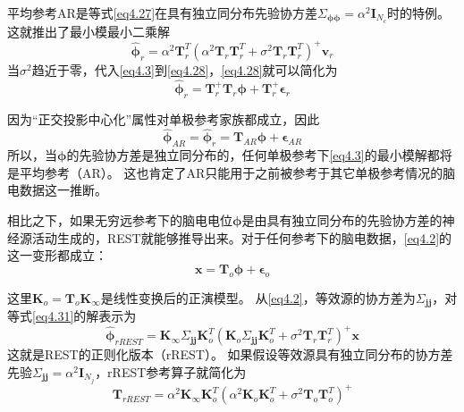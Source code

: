 平均参考AR是等式\eqref{eq4.27}在具有独立同分布先验协方差$\Sigma_{\mathbf{\phi\phi}}=\alpha^2\mathbf{I}_{N_c}$时的特例。 这就推出了最小模最小二乘解
\begin{equation}\label{eq4.28}
\hat{\mathbf{\phi}}_r=\alpha^2\mathbf{T}_r^T(\alpha^2\mathbf{T}_r\mathbf{T}_r^T+\sigma^2\mathbf{T}_r\mathbf{T}_r^T)^+\mathbf{v}_r
\end{equation}
当$\sigma^2$趋近于零，代入\eqref{eq4.3}到\eqref{eq4.28}，\eqref{eq4.28}就可以简化为
\begin{equation}\label{eq4.29}
\hat{\mathbf{\phi}}_r=\mathbf{T}_r^+\mathbf{T}_r\mathbf{\phi}+\mathbf{T}_r^+\mathbf{\epsilon}_r
\end{equation}

因为“正交投影中心化”属性对单极参考家族都成立，因此
\begin{equation}\label{eq4.30}
\hat{\mathbf{\phi}}_{AR}=\hat{\mathbf{\phi}}_r=\mathbf{T}_{AR}\mathbf{\phi}+\mathbf{\epsilon}_{AR}
\end{equation}
所以，当$\mathbf{\phi}$的先验协方差是独立同分布的，任何单极参考下\eqref{eq4.3}的最小模解都将是平均参考（AR）。 这也肯定了AR只能用于之前被参考于其它单极参考情况的脑电数据这一推断。

相比之下，如果无穷远参考下的脑电电位$\mathbf{\phi}$是由具有独立同分布的先验协方差的神经源活动生成的，REST就能够推导出来。对于任何参考下的脑电数据，\eqref{eq4.2}的这一变形都成立：
\begin{equation}\label{eq4.31}
\mathbf{x}=\mathbf{T}_o\mathbf{\phi}+\mathbf{\epsilon}_o
\end{equation}


这里$\mathbf{K}_o=\mathbf{T}_o\mathbf{K}_{\infty}$是线性变换后的正演模型。 从\eqref{eq4.2}，等效源的协方差为$\Sigma_{\mathbf{jj}}$，对等式\eqref{eq4.31}的解表示为
\begin{equation}\label{eq4.32}
\hat{\mathbf{\phi}}_{rREST}=\mathbf{K}_{\infty}\Sigma_{\mathbf{jj}}\mathbf{K}_o^T(\mathbf{K}_o\Sigma_{\mathbf{jj}}\mathbf{K}_o^T+\sigma^2\mathbf{T}_r\mathbf{T}_r^T)^+\mathbf{x}
\end{equation}
这就是REST的正则化版本（rREST）。 如果假设等效源具有独立同分布的协方差先验$\Sigma_\mathbf{jj}=\alpha^2\mathbf{I}_{N_j}$，rREST参考算子就简化为
\begin{equation}\label{eq4.33}
\mathbf{T}_{rREST}=\alpha^2\mathbf{K}_{\infty}\mathbf{K}_o^T(\alpha^2\mathbf{K}_o\mathbf{K}_o^T+\sigma^2\mathbf{T}_o\mathbf{T}_o^T)^+
\end{equation}

